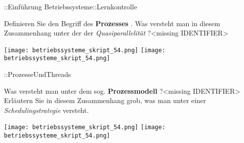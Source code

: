 \documentclass{article}
\begin{document}
\begin{tcolorbox}[colback=white!10!white,colframe=lightgray!75!black,
  savelowerto=\jobname_ex.tex]

\begin{center}
::Einführung Betriebssysteme::Lernkontrolle

\end{center}

\tcblower

\justifying

\end{tcolorbox}
\begin{tcolorbox}[colback=white!10!white,colframe=lightgray!75!black,
  savelowerto=\jobname_ex.tex]

\begin{center}
Definieren Sie den Begriff des 
\textbf{Prozesses
}. 
Was versteht man in diesem Zusammenhang unter der der 
\textit{Quasiparallelität
}?<missing IDENTIFIER>

\end{center}

\tcblower

\justifying
\texttt{[image: betriebssysteme\_skript\_54.png]}
\texttt{[image: betriebssysteme\_skript\_54.png]}

\end{tcolorbox}
\begin{tcolorbox}[colback=white!10!white,colframe=lightgray!75!black,
  savelowerto=\jobname_ex.tex]

\begin{center}
::ProzesseUndThreads

\end{center}

\tcblower

\justifying

\end{tcolorbox}
\begin{tcolorbox}[colback=white!10!white,colframe=lightgray!75!black,
  savelowerto=\jobname_ex.tex]

\begin{center}
Was versteht man unter dem sog. 
\textbf{Prozessmodell
}?<missing IDENTIFIER>
Erläutern Sie in diesem Zusammenhang grob, was man unter einer 
\textit{Schedulingstrategie
} versteht.

\end{center}

\tcblower

\justifying
\texttt{[image: betriebssysteme\_skript\_54.png]}
\texttt{[image: betriebssysteme\_skript\_54.png]}

\end{tcolorbox}
\end{document}
